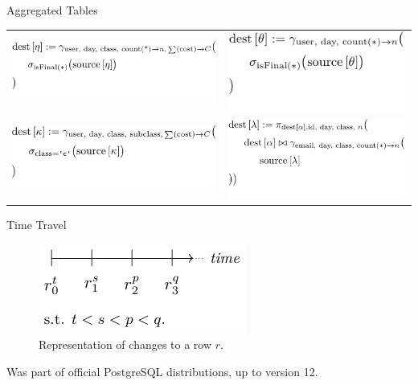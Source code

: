 \documentclass[aspectratio=169]{beamer}
\theoremstyle{definition}
\theoremstyle{remark}
\begin{document}
\begin{frame}{Aggregated Tables}
	\begin{tabular}{ll}
		\includegraphics{agg-eta} & \includegraphics{agg-theta} \\
		\includegraphics{agg-kappa} & \includegraphics{agg-lambda}
	\end{tabular}
\end{frame}

\begin{frame}{Time Travel}
	\begin{figure}
		\centering
		\includegraphics[width=0.4\linewidth]{../figures/time-travel/intro}
		\caption{Representation of changes to a row $r$.}
		\label{fig:tt-intro}
	\end{figure}

	Was part of official PostgreSQL distributions, up to version 12.
\end{frame}
\end{document}
